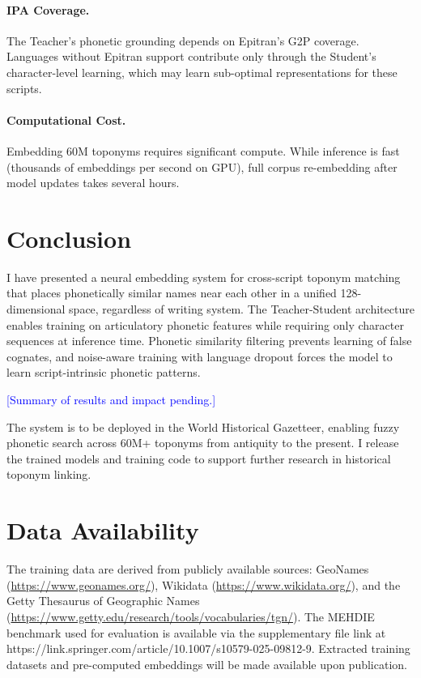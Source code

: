\documentclass[11pt,a4paper]{article}
\newcommand{\placeholder}[1]{\textcolor{blue}{[#1]}}
\newcommand{\embdim}{128}
\begin{document}
\paragraph{IPA Coverage.} The Teacher's phonetic grounding depends on Epitran's G2P coverage. Languages without Epitran support contribute only through the Student's character-level learning, which may learn sub-optimal representations for these scripts.

\paragraph{Computational Cost.} Embedding 60M toponyms requires significant compute. While inference is fast (thousands of embeddings per second on GPU), full corpus re-embedding after model updates takes several hours.


\section{Conclusion}
\label{sec:conclusion}

I have presented a neural embedding system for cross-script toponym matching that places phonetically similar names near each other in a unified \embdim-dimensional space, regardless of writing system. The Teacher-Student architecture enables training on articulatory phonetic features while requiring only character sequences at inference time. Phonetic similarity filtering prevents learning of false cognates, and noise-aware training with language dropout forces the model to learn script-intrinsic phonetic patterns.

\placeholder{Summary of results and impact pending.}

The system is to be deployed in the World Historical Gazetteer, enabling fuzzy phonetic search across 60M+ toponyms from antiquity to the present. I release the trained models and training code to support further research in historical toponym linking.


\section*{Data Availability}

The training data are derived from publicly available sources: GeoNames (\url{https://www.geonames.org/}), Wikidata (\url{https://www.wikidata.org/}), and the Getty Thesaurus of Geographic Names (\url{https://www.getty.edu/research/tools/vocabularies/tgn/}). The MEHDIE benchmark used for evaluation is available via the supplementary file link at https://link.springer.com/article/10.1007/s10579-025-09812-9. Extracted training datasets and pre-computed embeddings will be made available upon publication.
\end{document}
